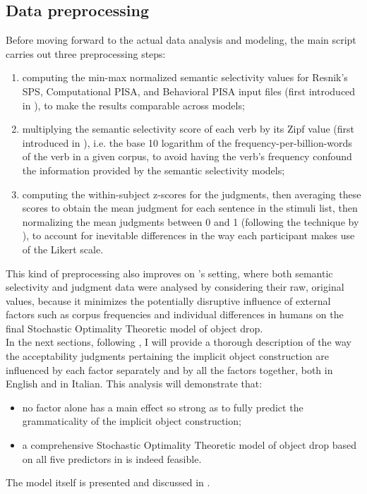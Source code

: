 \subsection{Data preprocessing} 

Before moving forward to the actual data analysis and modeling, the main script carries out three preprocessing steps:
\begin{enumerate}
    \item computing the min-max normalized semantic selectivity values for Resnik's SPS, Computational PISA, and Behavioral PISA input files (first introduced in ), to make the results comparable across models;
    \item multiplying the semantic selectivity score of each verb by its Zipf value (first introduced in ), i.e. the base 10 logarithm of the frequency-per-billion-words of the verb in a given corpus, to avoid having the verb's frequency confound the information provided by the semantic selectivity models;
    \item computing the within-subject z-scores for the judgments, then averaging these scores to obtain the mean judgment for each sentence in the stimuli list, then normalizing the mean judgments between 0 and 1 (following the technique by \textcite{KimEtAl2018, KimEtAl2019, KimEtAl2019a}), to account for inevitable differences in the way each participant makes use of the Likert scale.
\end{enumerate}

This kind of preprocessing also improves on \textcite{Medina2007}'s setting, where both semantic selectivity and judgment data were analysed by considering their raw, original values, because it minimizes the potentially disruptive influence of external factors such as corpus frequencies and individual differences in humans on the final Stochastic Optimality Theoretic model of object drop.\\
In the next sections, following \textcite{Medina2007}, I will provide a thorough description of the way the acceptability judgments pertaining the implicit object construction are influenced by each factor separately and by all the factors together, both in English and in Italian. This analysis will demonstrate that:
\begin{itemize}
    \item no factor alone has a main effect so strong as to fully predict the grammaticality of the implicit object construction;
    \item a comprehensive Stochastic Optimality Theoretic model of object drop based on all five predictors in  is indeed feasible.
\end{itemize}
The model itself is presented and discussed in .


